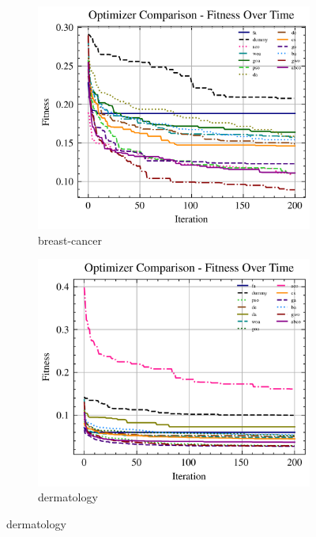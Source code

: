 \begin{figure}[htp]
    \centering
    \begin{subfigure}[b]{0.45\textwidth}
        \includegraphics[width=\textwidth]{imagenes/fitness_charts/img/binary/breast-cancer/optimizers_fitness_knn.png}
        \caption{breast-cancer}
        \label{fig:convergencia_breast_cancer_knn}
    \end{subfigure}
    \begin{subfigure}[b]{0.45\textwidth}
        \includegraphics[width=\textwidth]{imagenes/fitness_charts/img/binary/dermatology/optimizers_fitness_knn.png}
        \caption{dermatology}
        \label{fig:convergencia_dermatology_knn}
    \end{subfigure}


\end{figure}
